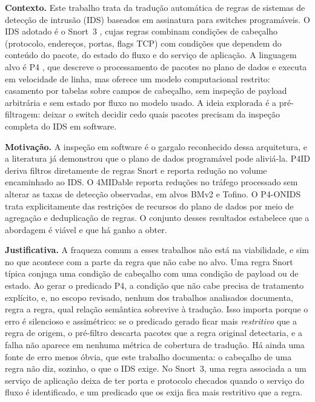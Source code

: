 \documentclass[12pt]{article}
\begin{document}
\textbf{Contexto.} Este trabalho trata da tradução automática de regras de
sistemas de detecção de intrusão (IDS) baseados em assinatura para switches
programáveis. O IDS adotado é o Snort~3 \cite{roesch1999snort,snort3manual},
cujas regras combinam condições de cabeçalho (protocolo, endereços, portas,
flags TCP) com condições que dependem do conteúdo do pacote, do estado do
fluxo e do serviço de aplicação. A linguagem alvo é P4 \cite{bosshart2014p4},
que descreve o processamento de pacotes no plano de dados e executa em
velocidade de linha, mas oferece um modelo computacional restrito: casamento
por tabelas sobre campos de cabeçalho, sem inspeção de payload arbitrária e
sem estado por fluxo no modelo usado. A ideia explorada é a pré-filtragem:
deixar o switch decidir cedo quais pacotes precisam da inspeção completa do
IDS em software.

\textbf{Motivação.} A inspeção em software é o gargalo reconhecido dessa
arquitetura, e a literatura já demonstrou que o plano de dados programável
pode aliviá-la. P4ID \cite{lewis2019p4id} deriva filtros diretamente de
regras Snort e reporta redução no volume encaminhado ao IDS. O
4MIDable \cite{lewis2023fourmidable} reporta reduções no tráfego processado
sem alterar as taxas de detecção observadas, em alvos BMv2 e Tofino. O
P4-ONIDS \cite{tavares2021p4onids} trata explicitamente das restrições de
recursos do plano de dados por meio de agregação e deduplicação de regras. O
conjunto desses resultados estabelece que a abordagem é viável e que há ganho
a obter.

\textbf{Justificativa.} A fraqueza comum a esses trabalhos não está na
viabilidade, e sim no que acontece com a parte da regra que não cabe no alvo.
Uma regra Snort típica conjuga uma condição de cabeçalho com uma condição de
payload ou de estado. Ao gerar o predicado P4, a condição que não cabe precisa
de tratamento explícito, e, no escopo revisado, nenhum dos trabalhos
analisados documenta, regra a regra, qual relação semântica sobrevive à
tradução. Isso importa porque o erro é silencioso e assimétrico: se o
predicado gerado ficar mais \emph{restritivo} que a regra de origem, o
pré-filtro descarta pacotes que a regra original detectaria, e a falha não
aparece em nenhuma métrica de cobertura de tradução. Há ainda uma fonte de
erro menos óbvia, que este trabalho documenta: o cabeçalho de uma regra não
diz, sozinho, o que o IDS exige. No Snort~3, uma regra associada a um serviço
de aplicação deixa de ter porta e protocolo checados quando o serviço do fluxo
é identificado, e um predicado que os exija fica mais restritivo que a regra.
\end{document}
